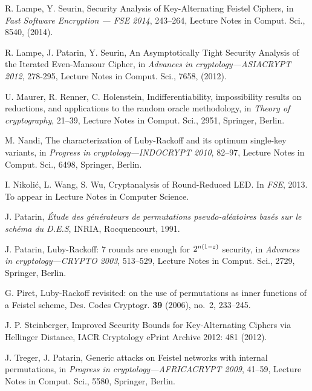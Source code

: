 \documentclass{llncs}
\begin{document}
\begin{thebibliography}{99}
R. Lampe, Y. Seurin, 
Security Analysis of Key-Alternating Feistel Ciphers,
in {\it Fast Software Encryption --- FSE 2014}, 243--264, Lecture Notes in Comput. Sci., 8540, (2014).

R. Lampe, J. Patarin, Y. Seurin, An Asymptotically Tight Security Analysis of the Iterated Even-Mansour
Cipher, in {\it Advances in cryptology---ASIACRYPT 2012}, 278-295, Lecture Notes in Comput. Sci., 7658, (2012).

U. Maurer, R. Renner, C. Holenstein, Indifferentiability, impossibility results on reductions, and applications to the random oracle methodology, in {\it Theory of cryptography}, 21--39, Lecture Notes in Comput. Sci., 2951, Springer, Berlin.

M. Nandi, The characterization of Luby-Rackoff and its optimum single-key variants, in {\it Progress in cryptology---INDOCRYPT 2010}, 82--97, Lecture Notes in Comput. Sci., 6498, Springer, Berlin.

I. Nikoli{\'c}, L. Wang, S. Wu, Cryptanalysis of Round-Reduced LED. In {\it FSE}, 2013. To appear in Lecture Notes in Computer Science.

J. Patarin, {\it \'Etude des g\'en\'erateurs de permutations pseudo-al\'eatoires bas\'es sur le sch\'ema du D.E.S}, INRIA, Rocquencourt, 1991.

J. Patarin, Luby-Rackoff: 7 rounds are enough for $2\sp {n(1-\varepsilon)}$ security, in {\it Advances in cryptology---CRYPTO 2003}, 513--529, Lecture Notes in Comput. Sci., 2729, Springer, Berlin.

G. Piret, Luby-Rackoff revisited: on the use of permutations as inner functions of a Feistel scheme, Des. Codes Cryptogr. {\bf 39} (2006), no.~2, 233--245.

J. P. Steinberger,
Improved Security Bounds for Key-Alternating Ciphers via Hellinger Distance,
IACR Cryptology ePrint Archive 2012: 481 (2012).

J. Treger, J. Patarin, Generic attacks on Feistel networks with internal permutations, in {\it Progress in cryptology---AFRICACRYPT 2009}, 41--59, Lecture Notes in Comput. Sci., 5580, Springer, Berlin. 


\end{thebibliography}
\end{document}
